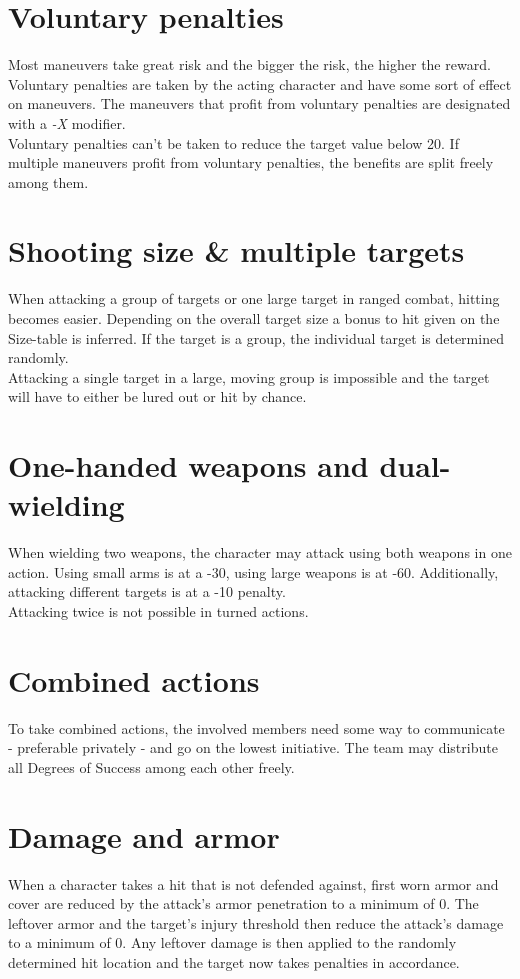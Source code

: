 \section{Voluntary penalties}
Most maneuvers take great risk and the bigger the risk, the higher the reward. Voluntary penalties are taken by the acting character and have some sort of effect on maneuvers. The maneuvers that profit from voluntary penalties are designated with a \emph{-X} modifier.\\
Voluntary penalties can’t be taken to reduce the target value below 20. If multiple maneuvers profit from voluntary penalties, the benefits are split freely among them.
\section{Shooting size \& multiple targets}
When attacking a group of targets or one large target in ranged combat, hitting becomes easier. Depending on the overall target size a bonus to hit given on the Size-table is inferred. If the target is a group, the individual target is determined randomly.\\
Attacking a single target in a large, moving group is impossible and the target will have to either be lured out or hit by chance.
\section{One-handed weapons and dual-wielding}
When wielding two weapons, the character may attack using both weapons in one action. Using small arms is at a -30, using large weapons is at -60. Additionally, attacking different targets is at a -10 penalty.\\
Attacking twice is not possible in turned actions.
\section{Combined actions}
\label{combinedaction}
To take combined actions, the involved members need some way to communicate - preferable privately - and go on the lowest initiative. The team may distribute all Degrees of Success among each other freely.
\section{Damage and armor}
When a character takes a hit that is not defended against, first worn armor and cover are reduced by the attack's armor penetration to a minimum of 0. The leftover armor and the target’s injury threshold then reduce the attack’s damage to a minimum of 0. Any leftover damage is then applied to the randomly determined hit location and the target now takes penalties in accordance.
